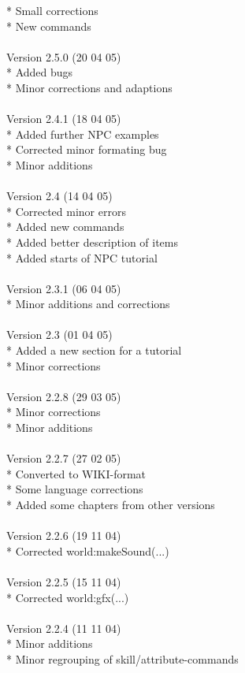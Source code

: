 \documentclass[a4paper,10pt,makeidx]{scrreprt}
\begin{document}
* Small corrections\\
* New commands\\
\\
Version 2.5.0 (20 04 05)\\
* Added bugs\\
* Minor corrections and adaptions\\
\\
Version 2.4.1 (18 04 05)\\
* Added further NPC examples\\
* Corrected minor formating bug\\
* Minor additions\\
\\
Version 2.4 (14 04 05)\\
* Corrected minor errors\\
* Added new commands\\
* Added better description of items\\
* Added starts of NPC tutorial\\
\\
Version 2.3.1 (06 04 05)\\
* Minor additions and corrections\\
\\
Version 2.3 (01 04 05)\\
* Added a new section for a tutorial\\
* Minor corrections\\
\\
Version 2.2.8 (29 03 05)\\
* Minor corrections\\
* Minor additions\\
\\
Version 2.2.7 (27 02 05)\\
* Converted to WIKI-format\\
* Some language corrections\\
* Added some chapters from other versions\\
\\
Version 2.2.6 (19 11 04)\\
* Corrected world:makeSound(...)\\
\\
Version 2.2.5 (15 11 04)\\
* Corrected world:gfx(...)\\
\\
Version 2.2.4 (11 11 04)\\
* Minor additions\\
* Minor regrouping of skill/attribute-commands\\
\end{document}
